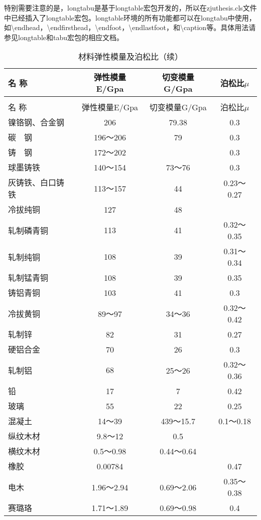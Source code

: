 特别需要注意的是，longtabu是基于longtable宏包开发的，所以在zjuthesis.cls文件中已经插入了longtable宏包。longtable环境的所有功能都可以在longtabu中使用，如\textbackslash endhead，\textbackslash endfirsthead，\textbackslash endfoot，\textbackslash endlastfoot，和\textbackslash caption等。具体用法请参见longtable和tabu宏包的相应文档。
\begin{longtabu}{lccc}
\caption{材料弹性模量及泊松比}\label{tab:tabu_test_3}\\
\toprule
名  称   & 弹性模量E/Gpa & 切变模量G/Gpa & 泊松比$\mu$ \\
\midrule%
\endfirsthead
\caption{材料弹性模量及泊松比（续）}\\
\toprule
名  称   & 弹性模量E/Gpa & 切变模量G/Gpa & 泊松比$\mu$ \\
\midrule%
\endhead
\bottomrule%
\endfoot
镍铬钢、合金钢 & 206    & 79.38  & 0.3 \\
碳　钢    &  196～206 & 79     & 0.3 \\
铸　钢    &  172～202 &        & 0.3 \\
球墨铸铁   &  140～154 &  73～76 & 0.3 \\
灰铸铁、白口铸铁 &  113～157 & 44     &  0.23～0.27 \\
冷拔纯铜   & 127    & 48     &   \\
轧制磷青铜  & 113    & 41     &  0.32～0.35 \\
轧制纯铜   & 108    & 39     &  0.31～0.34 \\
轧制锰青铜  & 108    & 39     & 0.35 \\
铸铝青铜   & 103    & 41     & 0.3 \\
冷拔黄铜   &  89～97 &  34～36 &  0.32～0.42 \\
轧制锌    & 82     & 31     & 0.27 \\
硬铝合金   & 70     & 26     & 0.3 \\
轧制铝    & 68     &  25～26 &  0.32～0.36 \\
铅      & 17     & 7      & 0.42 \\
玻璃     & 55     & 22     & 0.25 \\
混凝土    &  14～39 &  439～15.7 &  0.1～0.18 \\
纵纹木材   &  9.8～12 & 0.5    &   \\
横纹木材   &  0.5～0.98 &  0.44～0.64 &   \\
橡胶     & 0.00784 &        & 0.47 \\
电木     &  1.96～2.94 &  0.69～2.06 &  0.35～0.38 \\
赛璐珞    &  1.71～1.89 &  0.69～0.98 & 0.4 \\

\end{longtabu}
